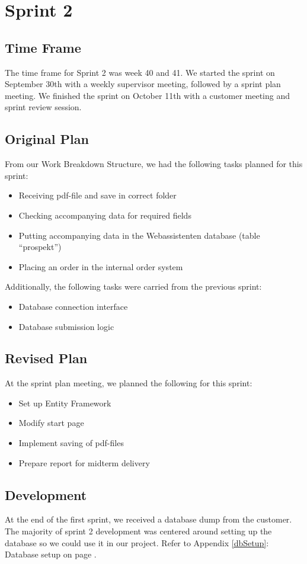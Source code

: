 \section{Sprint 2}

\subsection{Time Frame}
The time frame for Sprint 2 was week 40 and 41. We started the sprint on September 30th with a weekly supervisor meeting, followed by a sprint plan meeting. We finished the sprint on October 11th with a customer meeting and sprint review session.

\subsection{Original Plan}
From our Work Breakdown Structure, we had the following tasks planned for this sprint:
\begin{itemize}
	\item Receiving pdf-file and save in correct folder
	\item Checking accompanying data for required fields
	\item Putting accompanying data in the Webassistenten database (table “prospekt”)
	\item Placing an order in the internal order system
\end{itemize}

Additionally, the following tasks were carried from the previous sprint:
\begin{itemize}
	\item Database connection interface
	\item Database submission logic
\end{itemize}

\subsection{Revised Plan}
At the sprint plan meeting, we planned the following for this sprint:
\begin{itemize}
	\item Set up Entity Framework
	\item Modify start page
	\item Implement saving of pdf-files
	\item Prepare report for midterm delivery
\end{itemize}

\subsection{Development}
At the end of the first sprint, we received a database dump from the customer. The majority of sprint 2 development was centered around setting up the database so we could use it in our project. Refer to Appendix \ref{dbSetup}: Database setup on page \pageref{dbSetup}.

